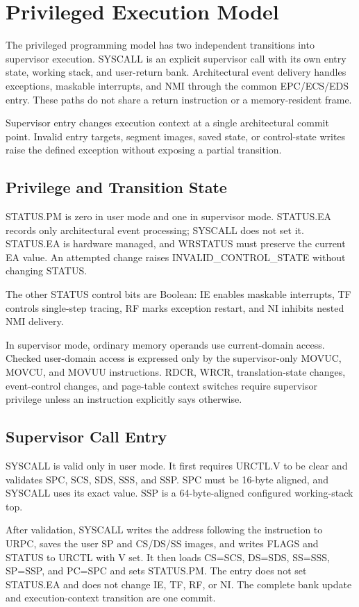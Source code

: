 \clearpage
\section{Privileged Execution Model}

The privileged programming model has two independent transitions into supervisor execution. SYSCALL is an explicit
supervisor call with its own entry state, working stack, and user-return bank. Architectural event delivery handles
exceptions, maskable interrupts, and NMI through the common EPC/ECS/EDS entry. These paths do not share a return
instruction or a memory-resident frame.

Supervisor entry changes execution context at a single architectural commit point. Invalid entry targets, segment
images, saved state, or control-state writes raise the defined exception without exposing a partial transition.

\subsection{Privilege and Transition State}
STATUS.PM is zero in user mode and one in supervisor mode. STATUS.EA records only architectural event processing;
SYSCALL does not set it. STATUS.EA is hardware managed, and WRSTATUS must preserve the current EA value. An attempted
change raises INVALID\_CONTROL\_STATE without changing STATUS.

The other STATUS control bits are Boolean: IE enables maskable interrupts, TF controls single-step tracing, RF marks
exception restart, and NI inhibits nested NMI delivery.

In supervisor mode, ordinary memory operands use current-domain access. Checked user-domain access is expressed only
by the supervisor-only MOVUC, MOVCU, and MOVUU instructions. RDCR, WRCR, translation-state changes, event-control
changes, and page-table context switches require supervisor privilege unless an instruction explicitly says
otherwise.

\subsection{Supervisor Call Entry}
SYSCALL is valid only in user mode. It first requires URCTL.V to be clear and validates SPC, SCS, SDS, SSS, and SSP.
SPC must be 16-byte aligned, and SYSCALL uses its exact value. SSP is a 64-byte-aligned configured working-stack
top.

After validation, SYSCALL writes the address following the instruction to URPC, saves the user SP and CS/DS/SS
images, and writes FLAGS and STATUS to URCTL with V set. It then loads CS=SCS, DS=SDS, SS=SSS, SP=SSP, and PC=SPC
and sets STATUS.PM. The entry does not set STATUS.EA and does not change IE, TF, RF, or NI. The complete bank update
and execution-context transition are one commit.


